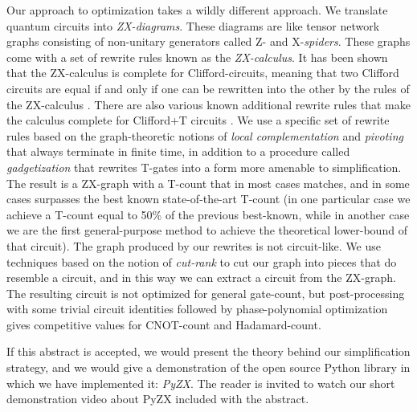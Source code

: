 \documentclass[a4paper,11pt]{article}
\begin{document}
Our approach to optimization takes a wildly different approach. We translate quantum circuits into \emph{ZX-diagrams}. These diagrams are like tensor network graphs consisting of non-unitary generators called Z- and X-\emph{spiders}. These graphs come with a set of rewrite rules known as the \emph{ZX-calculus}. It has been shown that the ZX-calculus is complete for Clifford-circuits, meaning that two Clifford circuits are equal if and only if one can be rewritten into the other by the rules of the ZX-calculus \cite{backens2016simplified}. There are also various known additional rewrite rules that make the calculus complete for Clifford+T circuits \cite{jeandel2018complete}. We use a specific set of rewrite rules based on the graph-theoretic notions of \emph{local complementation} and \emph{pivoting} that always terminate in finite time, in addition to a procedure called \emph{gadgetization} that rewrites T-gates into a form more amenable to simplification. The result is a ZX-graph with a T-count that in most cases matches, and in some cases surpasses the best known state-of-the-art T-count (in one particular case we achieve a T-count equal to 50\% of the previous best-known, while in another case we are the first general-purpose method to achieve the theoretical lower-bound of that circuit). The graph produced by our rewrites is not circuit-like. We use techniques based on the notion of \emph{cut-rank} to cut our graph into pieces that do resemble a circuit, and in this way we can extract a circuit from the ZX-graph. The resulting circuit is not optimized for general gate-count, but post-processing with some trivial circuit identities followed by phase-polynomial optimization gives competitive values for CNOT-count and Hadamard-count.

If this abstract is accepted, we would present the theory behind our simplification strategy, and we would give a demonstration of the open source Python library in which we have implemented it: \emph{PyZX}. The reader is invited to watch our short demonstration video about PyZX included with the abstract.




\end{document}

